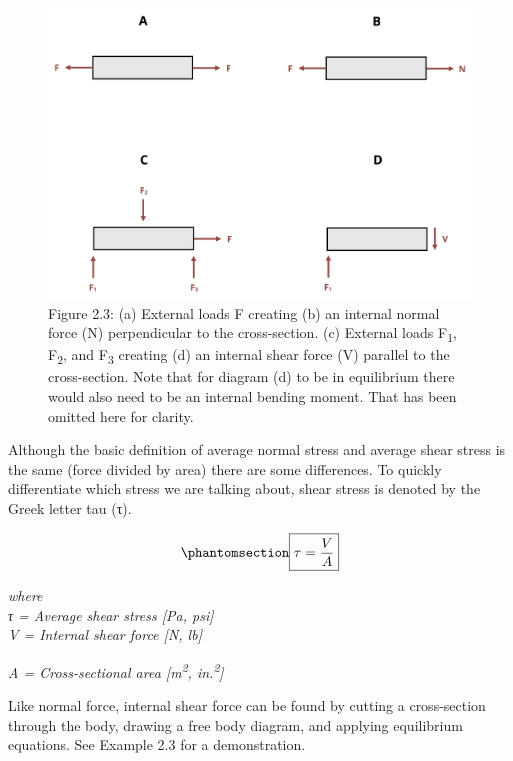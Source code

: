 \documentclass[
  letterpaper,
  DIV=11,
  numbers=noendperiod]{scrreprt}
\theoremstyle{definition}
\theoremstyle{remark}
\begin{document}
\begin{figure}[H]

{\centering \includegraphics{images/CH2 figures/2.3.png}

}

\caption{Figure 2.3: (a) External loads F creating (b) an internal
normal force (N) perpendicular to the cross-section. (c) External loads
F\textsubscript{1}, F\textsubscript{2}, and F\textsubscript{3} creating
(d) an internal shear force (V) parallel to the cross-section. Note that
for diagram (d) to be in equilibrium there would also need to be an
internal bending moment. That has been omitted here for clarity.}

\end{figure}%

Although the basic definition of average normal stress and average shear
stress is the same (force divided by area) there are some differences.
To quickly differentiate which stress we are talking about, shear stress
is denoted by the Greek letter tau (τ).

\begin{equation}\phantomsection\label{eq-2.2}{
\boxed{\tau=\frac{V}{A}}
}\end{equation}

\emph{where}\\
\emph{τ = Average shear stress {[}Pa, psi{]}}\\
\emph{V = Internal shear force {[}N, lb{]}}

\emph{A = Cross-sectional area {[}m\textsuperscript{2},
in.\textsuperscript{2}{]}}

Like normal force, internal shear force can be found by cutting a
cross-section through the body, drawing a free body diagram, and
applying equilibrium equations. See Example 2.3 for a demonstration.
\end{document}
